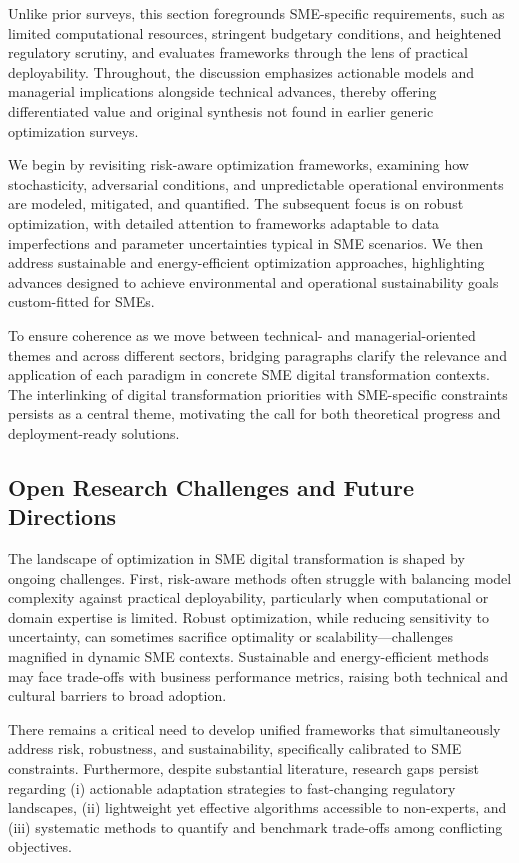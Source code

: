 \documentclass[sigconf]{acmart}
\begin{document}
Unlike prior surveys, this section foregrounds SME-specific requirements, such as limited computational resources, stringent budgetary conditions, and heightened regulatory scrutiny, and evaluates frameworks through the lens of practical deployability. Throughout, the discussion emphasizes actionable models and managerial implications alongside technical advances, thereby offering differentiated value and original synthesis not found in earlier generic optimization surveys.

We begin by revisiting risk-aware optimization frameworks, examining how stochasticity, adversarial conditions, and unpredictable operational environments are modeled, mitigated, and quantified. The subsequent focus is on robust optimization, with detailed attention to frameworks adaptable to data imperfections and parameter uncertainties typical in SME scenarios. We then address sustainable and energy-efficient optimization approaches, highlighting advances designed to achieve environmental and operational sustainability goals custom-fitted for SMEs.

To ensure coherence as we move between technical- and managerial-oriented themes and across different sectors, bridging paragraphs clarify the relevance and application of each paradigm in concrete SME digital transformation contexts. The interlinking of digital transformation priorities with SME-specific constraints persists as a central theme, motivating the call for both theoretical progress and deployment-ready solutions.

\subsection{Open Research Challenges and Future Directions}

The landscape of optimization in SME digital transformation is shaped by ongoing challenges. First, risk-aware methods often struggle with balancing model complexity against practical deployability, particularly when computational or domain expertise is limited. Robust optimization, while reducing sensitivity to uncertainty, can sometimes sacrifice optimality or scalability—challenges magnified in dynamic SME contexts. Sustainable and energy-efficient methods may face trade-offs with business performance metrics, raising both technical and cultural barriers to broad adoption.

There remains a critical need to develop unified frameworks that simultaneously address risk, robustness, and sustainability, specifically calibrated to SME constraints. Furthermore, despite substantial literature, research gaps persist regarding (i) actionable adaptation strategies to fast-changing regulatory landscapes, (ii) lightweight yet effective algorithms accessible to non-experts, and (iii) systematic methods to quantify and benchmark trade-offs among conflicting objectives.
\end{document}
